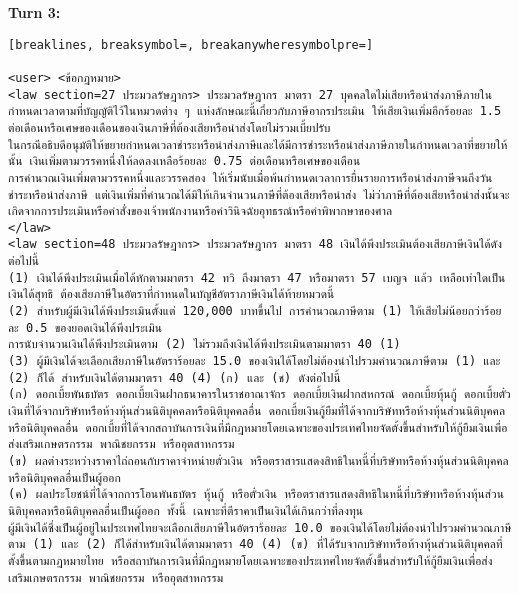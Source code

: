 \textbf{Turn 3: }
\begin{Verbatim}[breaklines, breaksymbol=, breakanywheresymbolpre=]

<user> <ข้อกฎหมาย>
<law section=27 ประมวลรัษฎากร> ประมวลรัษฎากร มาตรา 27 บุคคลใดไม่เสียหรือนำส่งภาษีภายในกำหนดเวลาตามที่บัญญัติไว้ในหมวดต่าง ๆ แห่งลักษณะนี้เกี่ยวกับภาษีอากรประเมิน ให้เสียเงินเพิ่มอีกร้อยละ 1.5 ต่อเดือนหรือเศษของเดือนของเงินภาษีที่ต้องเสียหรือนำส่งโดยไม่รวมเบี้ยปรับ
ในกรณีอธิบดีอนุมัติให้ขยายกำหนดเวลาชำระหรือนำส่งภาษีและได้มีการชำระหรือนำส่งภาษีภายในกำหนดเวลาที่ขยายให้นั้น เงินเพิ่มตามวรรคหนึ่งให้ลดลงเหลือร้อยละ 0.75 ต่อเดือนหรือเศษของเดือน
การคำนวณเงินเพิ่มตามวรรคหนึ่งและวรรคสอง ให้เริ่มนับเมื่อพ้นกำหนดเวลาการยื่นรายการหรือนำส่งภาษีจนถึงวันชำระหรือนำส่งภาษี แต่เงินเพิ่มที่คำนวณได้มิให้เกินจำนวนภาษีที่ต้องเสียหรือนำส่ง ไม่ว่าภาษีที่ต้องเสียหรือนำส่งนั้นจะเกิดจากการประเมินหรือคำสั่งของเจ้าพนักงานหรือคำวินิจฉัยอุทธรณ์หรือคำพิพากษาของศาล
</law>
<law section=48 ประมวลรัษฎากร> ประมวลรัษฎากร มาตรา 48 เงินได้พึงประเมินต้องเสียภาษีเงินได้ดังต่อไปนี้
(1) เงินได้พึงประเมินเมื่อได้หักตามมาตรา 42 ทวิ ถึงมาตรา 47 หรือมาตรา 57 เบญจ แล้ว เหลือเท่าใดเป็นเงินได้สุทธิ ต้องเสียภาษีในอัตราที่กำหนดในบัญชีอัตราภาษีเงินได้ท้ายหมวดนี้
(2) สำหรับผู้มีเงินได้พึงประเมินตั้งแต่ 120,000 บาทขึ้นไป การคำนวณภาษีตาม (1) ให้เสียไม่น้อยกว่าร้อยละ 0.5 ของยอดเงินได้พึงประเมิน
การนับจำนวนเงินได้พึงประเมินตาม (2) ไม่รวมถึงเงินได้พึงประเมินตามมาตรา 40 (1)
(3) ผู้มีเงินได้จะเลือกเสียภาษีในอัตราร้อยละ 15.0 ของเงินได้โดยไม่ต้องนำไปรวมคำนวณภาษีตาม (1) และ (2) ก็ได้ สำหรับเงินได้ตามมาตรา 40 (4) (ก) และ (ช) ดังต่อไปนี้
(ก) ดอกเบี้ยพันธบัตร ดอกเบี้ยเงินฝากธนาคารในราชอาณาจักร ดอกเบี้ยเงินฝากสหกรณ์ ดอกเบี้ยหุ้นกู้ ดอกเบี้ยตั๋วเงินที่ได้จากบริษัทหรือห้างหุ้นส่วนนิติบุคคลหรือนิติบุคคลอื่น ดอกเบี้ยเงินกู้ยืมที่ได้จากบริษัทหรือห้างหุ้นส่วนนิติบุคคลหรือนิติบุคคลอื่น ดอกเบี้ยที่ได้จากสถาบันการเงินที่มีกฎหมายโดยเฉพาะของประเทศไทยจัดตั้งขึ้นสำหรับให้กู้ยืมเงินเพื่อส่งเสริมเกษตรกรรม พาณิชยกรรม หรืออุตสาหกรรม
(ข) ผลต่างระหว่างราคาไถ่ถอนกับราคาจำหน่ายตั๋วเงิน หรือตราสารแสดงสิทธิในหนี้ที่บริษัทหรือห้างหุ้นส่วนนิติบุคคลหรือนิติบุคคลอื่นเป็นผู้ออก
(ค) ผลประโยชน์ที่ได้จากการโอนพันธบัตร หุ้นกู้ หรือตั๋วเงิน หรือตราสารแสดงสิทธิในหนี้ที่บริษัทหรือห้างหุ้นส่วนนิติบุคคลหรือนิติบุคคลอื่นเป็นผู้ออก ทั้งนี้ เฉพาะที่ตีราคาเป็นเงินได้เกินกว่าที่ลงทุน
ผู้มีเงินได้ซึ่งเป็นผู้อยู่ในประเทศไทยจะเลือกเสียภาษีในอัตราร้อยละ 10.0 ของเงินได้โดยไม่ต้องนำไปรวมคำนวณภาษีตาม (1) และ (2) ก็ได้สำหรับเงินได้ตามมาตรา 40 (4) (ข) ที่ได้รับจากบริษัทหรือห้างหุ้นส่วนนิติบุคคลที่ตั้งขึ้นตามกฎหมายไทย หรือสถาบันการเงินที่มีกฎหมายโดยเฉพาะของประเทศไทยจัดตั้งขึ้นสำหรับให้กู้ยืมเงินเพื่อส่งเสริมเกษตรกรรม พาณิชยกรรม หรืออุตสาหกรรม

\end{Verbatim}
